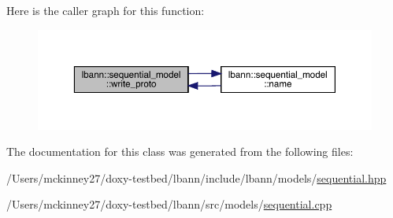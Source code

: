 Here is the caller graph for this function\+:\nopagebreak
\begin{figure}[H]
\begin{center}
\leavevmode
\includegraphics[width=350pt]{classlbann_1_1sequential__model_a53a83327a1115a53affa78c93344e641_icgraph}
\end{center}
\end{figure}


The documentation for this class was generated from the following files\+:\begin{DoxyCompactItemize}
\item 
/\+Users/mckinney27/doxy-\/testbed/lbann/include/lbann/models/\hyperlink{sequential_8hpp}{sequential.\+hpp}\item 
/\+Users/mckinney27/doxy-\/testbed/lbann/src/models/\hyperlink{sequential_8cpp}{sequential.\+cpp}\end{DoxyCompactItemize}
